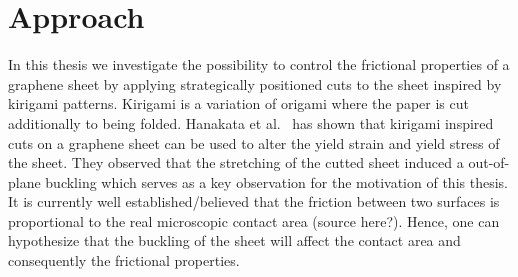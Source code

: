 



\section{Approach}


In this thesis we investigate the possibility to control the frictional
properties of a graphene sheet by applying strategically positioned cuts to the
sheet inspired by kirigami patterns. Kirigami is a variation of origami where
the paper is cut additionally to being folded. Hanakata et al.\
\cite{PhysRevResearch.2.042006} has shown that kirigami inspired cuts on a
graphene sheet can be used to alter the yield strain and yield stress of the
sheet. They observed that the stretching of the cutted sheet induced a
out-of-plane buckling which serves as a key observation for the motivation of
this thesis. It is currently well established/believed that the friction between
two surfaces is proportional to the real microscopic contact area (source
here?). Hence, one can hypothesize that the buckling of the sheet will affect
the contact area and consequently the frictional properties. 



